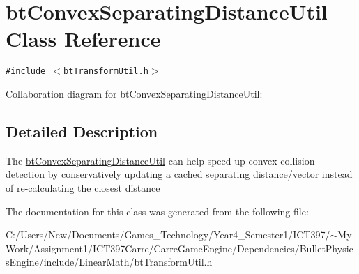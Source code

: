 \hypertarget{classbt_convex_separating_distance_util}{
\section{btConvexSeparatingDistanceUtil Class Reference}
\label{classbt_convex_separating_distance_util}
}
{\tt \#include $<$btTransformUtil.h$>$}

Collaboration diagram for btConvexSeparatingDistanceUtil:

\subsection{Detailed Description}
The \hyperlink{classbt_convex_separating_distance_util}{btConvexSeparatingDistanceUtil} can help speed up convex collision detection by conservatively updating a cached separating distance/vector instead of re-calculating the closest distance 

The documentation for this class was generated from the following file:\begin{CompactItemize}
\item 
C:/Users/New/Documents/Games\_\-Technology/Year4\_\-Semester1/ICT397/$\sim$My Work/Assignment1/ICT397Carre/CarreGameEngine/Dependencies/BulletPhysicsEngine/include/LinearMath/btTransformUtil.h\end{CompactItemize}
